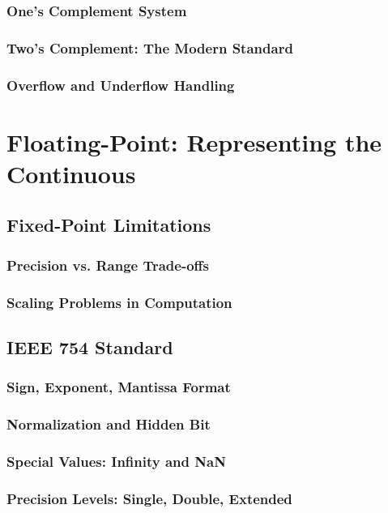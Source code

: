 \documentclass[12pt, oneside]{book}
\begin{document}
\subsubsection{One's Complement System}
\subsubsection{Two's Complement: The Modern Standard}
\subsubsection{Overflow and Underflow Handling}

\section{Floating-Point: Representing the Continuous}
\subsection{Fixed-Point Limitations}
\subsubsection{Precision vs. Range Trade-offs}
\subsubsection{Scaling Problems in Computation}

\subsection{IEEE 754 Standard}
\subsubsection{Sign, Exponent, Mantissa Format}
\subsubsection{Normalization and Hidden Bit}
\subsubsection{Special Values: Infinity and NaN}
\subsubsection{Precision Levels: Single, Double, Extended}
\end{document}
